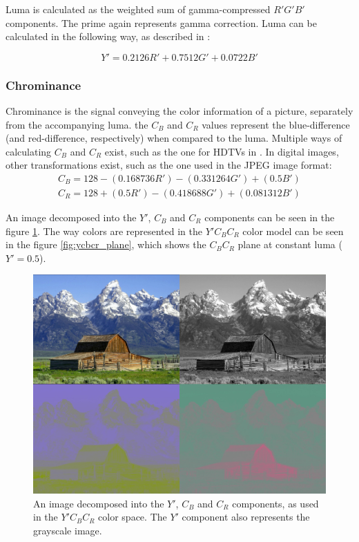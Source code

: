 \documentclass[thesis=M,english]{FITthesis}[2012/10/20]
\begin{document}
Luma is calculated as the weighted sum of gamma-compressed $R'G'B'$ components. The prime
again represents gamma correction. Luma can be calculated in the following way, as described in
\cite{img:rec-709}:

\begin{equation}
  \label{formula:luma}
  Y' = 0.2126R' + 0.7512G' + 0.0722B'
\end{equation}

\subsubsection{Chrominance}
Chrominance is the signal conveying the color information of a picture, separately
from the accompanying luma. the $C_{B}$ and $C_{R}$ values represent the blue-difference
(and red-difference, respectively) when compared to the luma.
Multiple ways of calculating $C_{B}$ and $C_{R}$ exist, such as the one for HDTVs in \cite{img:rec-709}.
In digital images, other transformations exist, such as the one used in the JPEG image format:
\begin{equation}
  \begin{aligned}
    C_B = 128 - (0.168736R') - (0.331264G') + (0.5B')\\
    C_R = 128 + (0.5R') - (0.418688G') + (0.081312B')
  \end{aligned}
\end{equation}
\cite{jfif}

An image decomposed into the $Y'$, $C_B$ and $C_R$ components can be seen in the figure
\ref{fig:house-ycbcrdecomp}. The way colors are represented in the $Y'C_BC_R$ color model
can be seen in the figure \ref{fig:ycbcr_plane}, which shows the $C_BC_R$ plane at constant
luma ($Y' = 0.5$).

\begin{figure}[h]
  \centering
  \includegraphics[scale=0.5]{imgs/houses-decomp-ycbcr}
  \caption[Image decomposed into $Y'$, $C_B$ and $C_R$ channels]{An image decomposed into the $Y'$, $C_B$ and $C_R$ components, as used
           in the $Y'C_BC_R$ color space. The $Y'$ component also represents the
           grayscale image.}
  \label{fig:house-ycbcrdecomp}
\end{figure}
\end{document}
